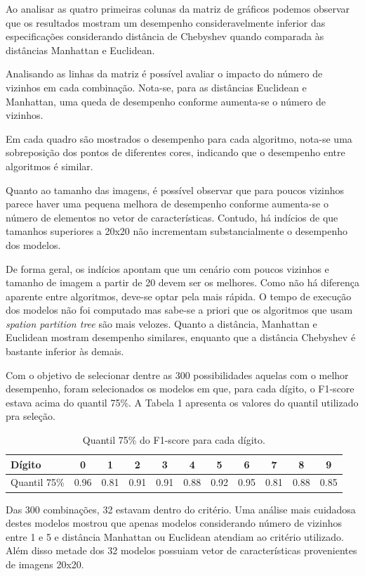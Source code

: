 \documentclass[
	12pt,				%
	openright,			%
	twoside,			%
	a4paper,			%
	english,			%
	brazil,				%
	svgnames
	]{abntex2}\usepackage[]{graphicx}\usepackage[]{color}
\begin{document}
Ao analisar as quatro primeiras colunas da matriz de gráficos podemos observar que os resultados mostram um desempenho consideravelmente inferior das especificações considerando distância de Chebyshev quando comparada às distâncias Manhattan e Euclidean.

Analisando as linhas da matriz é possível avaliar o impacto do número de vizinhos em cada combinação. Nota-se, para as distâncias Euclidean e Manhattan, uma queda de desempenho conforme aumenta-se o número de vizinhos. 

Em cada quadro são mostrados o desempenho para cada algoritmo, nota-se uma sobreposição dos pontos de diferentes cores, indicando que o desempenho entre algoritmos é similar.

Quanto ao tamanho das imagens, é possível observar que para poucos vizinhos parece haver uma pequena melhora de desempenho conforme aumenta-se o número de elementos no vetor de características. Contudo, há indícios de que tamanhos superiores a 20x20 não incrementam substancialmente o desempenho dos modelos.

De forma geral, os indícios apontam que um cenário com poucos vizinhos e tamanho de imagem a partir de 20 devem ser os melhores. Como não há diferença aparente entre algoritmos, deve-se optar pela mais rápida. O tempo de execução dos modelos não foi computado mas sabe-se a priori que os algoritmos que usam \emph{spation partition tree} são mais velozes. Quanto a distância, Manhattan e Euclidean mostram desempenho similares, enquanto que a distância Chebyshev é bastante inferior às demais.

Com o objetivo de selecionar dentre as 300 possibilidades aquelas com o melhor desempenho, foram selecionados os modelos em que, para cada dígito, o F1-score estava acima do quantil 75\%. A Tabela 1 apresenta os valores do quantil utilizado pra seleção.

\begin{table}[h]
\centering
\begin{tabular}{lcccccccccc}
\hline
Dígito       & 0    & 1    & 2    & 3    & 4    & 5    & 6    & 7    & 8    & 9    \\ \hline
Quantil 75\% & 0.96 & 0.81 & 0.91 & 0.91 & 0.88 & 0.92 & 0.95 & 0.81 & 0.88 & 0.85 \\ \hline
\end{tabular}
\caption{Quantil 75\% do F1-score para cada dígito.}
\label{tab:table1}
\end{table}

Das 300 combinações, 32 estavam dentro do critério. Uma análise mais cuidadosa destes modelos mostrou que apenas modelos considerando número de vizinhos entre 1 e 5 e distância Manhattan ou Euclidean atendiam ao critério utilizado. Além disso metade dos 32 modelos possuiam vetor de características provenientes de imagens 20x20.
\end{document}
